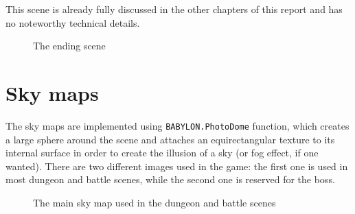 This scene is already fully discussed in the other chapters of this report and has no noteworthy technical details.

\begin{figure}[H]
    \centering
    \caption{The ending scene}
\end{figure}

\section{Sky maps}
The sky maps are implemented using \texttt{BABYLON.PhotoDome} function, which creates a large sphere around the scene and attaches an equirectangular texture to its internal surface in order to create the illusion of a sky (or fog effect, if one wanted). There are two different images used in the game: the first one is used in most dungeon and battle scenes, while the second one is reserved for the boss.

\begin{figure}[H]
    \centering
    \caption{The main sky map used in the dungeon and battle scenes}
\end{figure}

